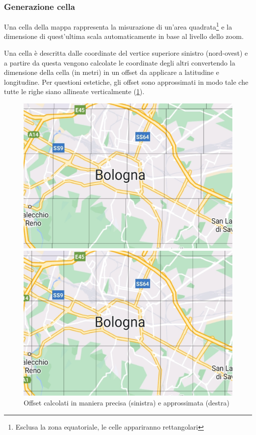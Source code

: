 \documentclass[11pt]{article}
\begin{document}
\subsubsection{Generazione cella}
Una cella della mappa rappresenta la misurazione di un'area quadrata\footnote{Esclusa la zona equatoriale, le celle appariranno rettangolari} e la dimensione di quest'ultima scala automaticamente in base al livello dello zoom.

Una cella è descritta dalle coordinate del vertice superiore sinistro (nord-ovest) e a partire da questa vengono calcolate le coordinate degli altri convertendo la dimensione della cella (in metri) in un offset da applicare a latitudine e longitudine.
Per questioni estetiche, gli offset sono approssimati in modo tale che tutte le righe siano allineate verticalmente (\cref{fig:tile_offset}).
\begin{figure}[H]
    \centering
    \begin{minipage}[b]{0.45\textwidth}
      \includegraphics[width=\textwidth]{./img/tile_no_approx.jpg}
    \end{minipage}
    \hfill
    \begin{minipage}[b]{0.45\textwidth}
      \includegraphics[width=\textwidth]{./img/tile_approx.jpg}
    \end{minipage}
    \caption{Offset calcolati in maniera precisa (sinistra) e approssimata (destra)} \label{fig:tile_offset}
\end{figure}
\end{document}
